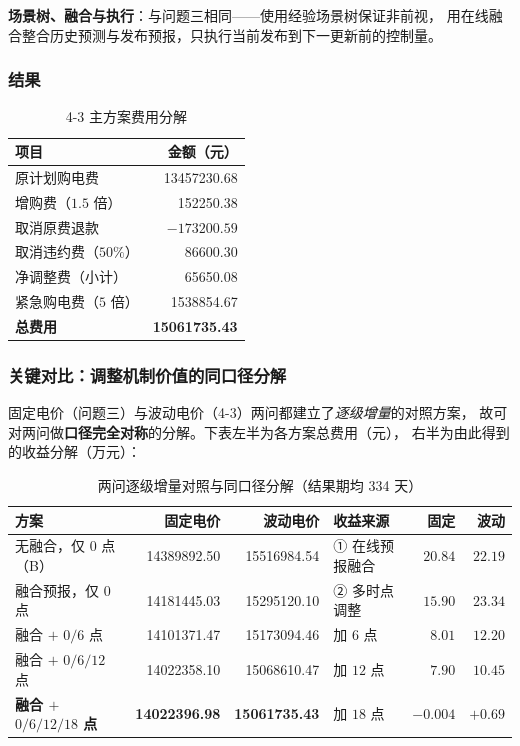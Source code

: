 \textbf{场景树、融合与执行}：与问题三相同——使用经验场景树保证非前视，
用在线融合整合历史预测与发布预报，只执行当前发布到下一更新前的控制量。

\subsubsection{结果}

\begin{table}[H]
\centering
\caption{4-3 主方案费用分解}
\label{tab:q43}
\begin{tabular}{@{}l r@{}}
\toprule
项目 & {金额（元）} \\
\midrule
原计划购电费       & 13457230.68 \\
增购费（$1.5$ 倍）   & 152250.38 \\
取消原费退款       & $-173200.59$ \\
取消违约费（$50\%$） & 86600.30 \\
净调整费（小计）     & 65650.08 \\
紧急购电费（$5$ 倍） & 1538854.67 \\
\midrule
\textbf{总费用} & \bfseries 15061735.43 \\
\bottomrule
\end{tabular}
\end{table}

\subsubsection{关键对比：调整机制价值的同口径分解}

固定电价（问题三）与波动电价（4-3）两问都建立了\emph{逐级增量}的对照方案，
故可对两问做\textbf{口径完全对称}的分解。下表左半为各方案总费用（元），
右半为由此得到的收益分解（万元）：

\begin{table}[H]
\centering
\small
\caption{两问逐级增量对照与同口径分解（结果期均 334 天）}
\label{tab:q4-compare}
\setlength{\tabcolsep}{4pt}
\begin{tabular}{@{}l r r@{\hskip 8pt}l r r@{}}
\toprule
方案 & 固定电价 & 波动电价 & 收益来源 & 固定 & 波动 \\
\midrule
无融合，仅 $0$ 点（B）    & 14389892.50 & 15516984.54
  & ① 在线预报融合 & $20.84$ & $22.19$ \\
融合预报，仅 $0$ 点       & 14181445.03 & 15295120.10
  & ② 多时点调整 & $15.90$ & \bfseries $23.34$ \\
融合 $+$ $0/6$ 点         & 14101371.47 & 15173094.46
  & \quad 加 $6$ 点  & $8.01$ & $12.20$ \\
融合 $+$ $0/6/12$ 点      & 14022358.10 & 15068610.47
  & \quad 加 $12$ 点 & $7.90$ & $10.45$ \\
\textbf{融合 $+$ $0/6/12/18$ 点} & \bfseries 14022396.98 & \bfseries 15061735.43
  & \quad 加 $18$ 点 & $-0.004$ & $+0.69$ \\
\bottomrule
\end{tabular}
\end{table}

